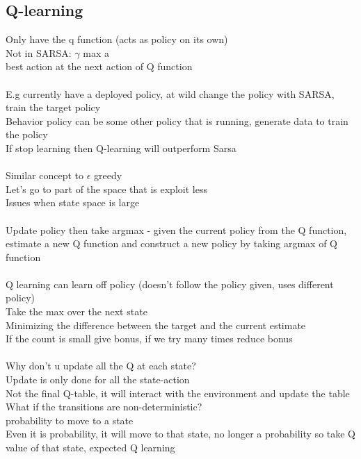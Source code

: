 \documentclass[11pt]{article}
\begin{document}
\subsection*{Q-learning}
Only have the q function (acts as policy on its own)\\
Not in SARSA: $\gamma$  max a \\
best action at the next action of Q function\\
\\
E.g currently have a deployed policy, at wild change the policy with SARSA, train the target policy\\
Behavior policy can be some other policy that is running, generate data to train the policy
\\
If stop learning then Q-learning will outperform Sarsa
\\
\\
Similar concept to $\epsilon$ greedy\\
Let's go to part of the space that is exploit less\\
Issues when state space is large\\
\\
Update policy then take argmax - given the current policy from the Q function, estimate a new Q function and construct a new policy by taking argmax of Q function\\\\
Q learning can learn off policy (doesn't follow the policy given, uses different policy)\\
Take the max over the next state\\
Minimizing the difference between the target and the current estimate\\
If the count is small give bonus, if we try many times reduce bonus\\
\\
Why don't u update all the Q at each state?\\
Update is only done for all the state-action\\
Not the final Q-table, it will interact with the environment and update the table
\\
What if the transitions are non-deterministic?\\
probability to move to a state\\
Even it is probability, it will move to that state, no longer a probability so take Q value of that state, expected Q learning
\end{document}

